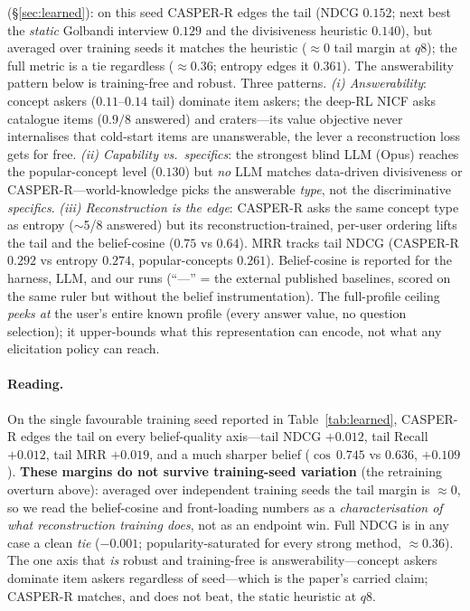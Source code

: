 \documentclass[11pt]{article}
\begin{document}
\begin{table}[h]
{(\S\ref{sec:learned}): on this seed CASPER-R edges the tail (NDCG $\mathbf{0.152}$; next best the \emph{static} Golbandi
interview $0.129$ and the divisiveness heuristic $0.140$), but averaged over training seeds it matches the heuristic
($\approx0$ tail margin at $q8$); the full metric is a tie regardless ($\approx0.36$; entropy edges it $0.361$). The
answerability pattern below is training-free and robust. Three patterns. \emph{(i) Answerability}: concept askers ($0.11$--$0.14$ tail) dominate item askers; the
deep-RL \textsc{NICF} \cite{nicf} asks catalogue items ($0.9/8$ answered) and craters---its value objective never
internalises that cold-start items are unanswerable, the lever a reconstruction loss gets for free. \emph{(ii)
Capability vs.\ specifics}: the strongest blind LLM (Opus) reaches the popular-concept level ($0.130$) but \emph{no} LLM
matches data-driven divisiveness or CASPER-R---world-knowledge picks the answerable \emph{type}, not the discriminative
\emph{specifics}. \emph{(iii) Reconstruction is the edge}: CASPER-R asks the same concept type as entropy ($\sim$5/8
answered) but its reconstruction-trained, per-user ordering lifts the tail and the belief-cosine ($0.75$ vs $0.64$). MRR
tracks tail NDCG (CASPER-R $0.292$ vs entropy $0.274$, popular-concepts $0.261$). Belief-cosine is reported for the
harness, LLM, and our runs (``---'' = the external published baselines, scored on the same ruler but without the
belief instrumentation). The full-profile ceiling \emph{peeks at} the user's entire known profile (every answer value,
no question selection); it upper-bounds what this representation can encode, not what any elicitation policy can reach.}
\label{tab:learned}
\end{table}

\paragraph{Reading.} On the single favourable training seed reported in Table~\ref{tab:learned}, CASPER-R edges the tail
on every belief-quality axis---tail NDCG $+0.012$, tail Recall $+0.012$, tail MRR $+0.019$, and a much sharper belief
($\cos\,0.745$ vs $0.636$, $+0.109$). \textbf{These margins do not survive training-seed variation} (the retraining
overturn above): averaged over independent training seeds the tail margin is $\approx0$, so we read the belief-cosine and
front-loading numbers as a \emph{characterisation of what reconstruction training does}, not as an endpoint win. Full
NDCG is in any case a clean \emph{tie} ($-0.001$; popularity-saturated for every strong method, $\approx0.36$). The one
axis that \emph{is} robust and training-free is answerability---concept askers dominate item askers regardless of
seed---which is the paper's carried claim; CASPER-R matches, and does not beat, the static heuristic at $q8$.
\end{document}
